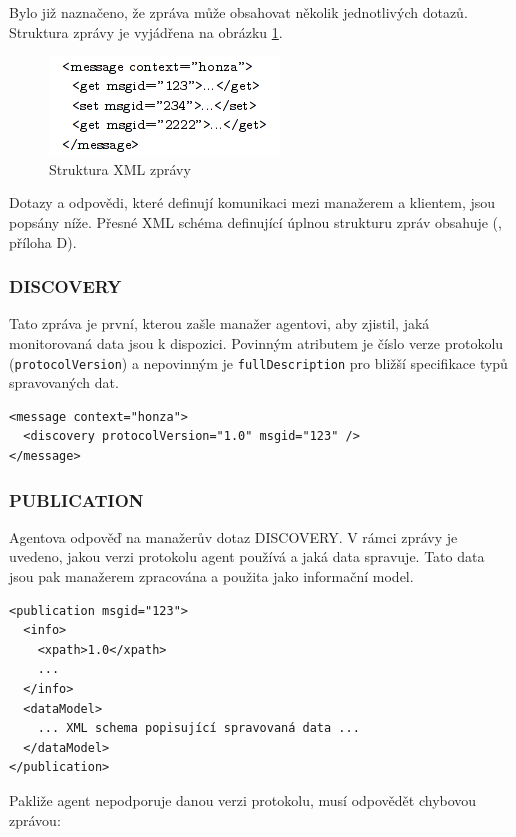 Bylo již naznačeno, že zpráva může obsahovat několik jednotlivých dotazů. Struktura zprávy je vyjádřena na obrázku \ref{obr_xml_struktura_zpravy}.

\begin{figure}[htp]
	\begin{center}
		\includegraphics{obrazky/03_struktura_zpravy.png}
		\caption{Struktura XML zprávy}
		\label{obr_xml_struktura_zpravy}
	\end{center}
\end{figure}

Dotazy a odpovědi, které definují komunikaci mezi manažerem a klientem, jsou popsány níže. Přesné XML schéma definující úplnou strukturu zpráv obsahuje (\cite{macejko_dipl}, příloha D).

\subsubsection*{DISCOVERY}
Tato zpráva je první, kterou zašle manažer agentovi, aby zjistil, jaká monitorovaná data jsou k dispozici.
Povinným atributem je číslo verze protokolu (\verb|protocolVersion|) a nepovinným je \verb|fullDescription| pro bližší specifikace
typů spravovaných dat.

\begin{verbatim}
<message context="honza">
  <discovery protocolVersion="1.0" msgid="123" />
</message>
\end{verbatim}

\subsubsection*{PUBLICATION}
Agentova odpověď na manažerův dotaz DISCOVERY. V rámci zprávy je uvedeno, jakou verzi protokolu agent používá a jaká data spravuje. Tato data jsou pak
manažerem zpracována a použita jako informační model.

\begin{verbatim}
<publication msgid="123">
  <info>
    <xpath>1.0</xpath>
    ...
  </info>
  <dataModel>
    ... XML schema popisující spravovaná data ...
  </dataModel>
</publication>
\end{verbatim}

Pakliže agent nepodporuje danou verzi protokolu, musí odpovědět chybovou zprávou:

